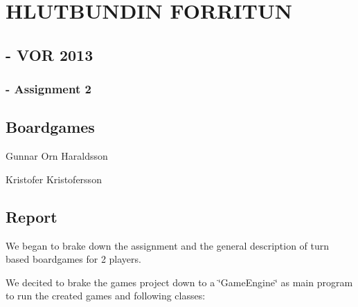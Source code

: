 \section*{H\-L\-U\-T\-B\-U\-N\-D\-I\-N F\-O\-R\-R\-I\-T\-U\-N}

\begin{center} \subsection*{-\/ V\-O\-R 2013}\end{center} 

\begin{center} \subsubsection*{-\/ Assignment 2}\end{center} 

\begin{center} \section*{Boardgames}\end{center} 

\begin{center} \end{center}   \begin{center} \end{center} 

\begin{center} Gunnar Orn Haraldsson \end{center} 

\begin{center} \end{center} 

\begin{center} Kristofer Kristofersson \end{center} 

\begin{center} \end{center}  



\subsection*{Report}

We began to brake down the assignment and the general description of turn based boardgames for 2 players. 

We decited to brake the games project down to a \char`\"{}\-Game\-Engine\char`\"{} as main program to run the created games and following classes\-: 


